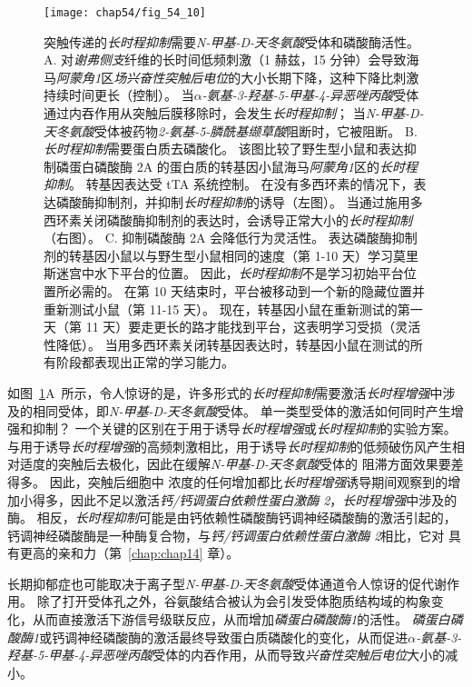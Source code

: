\begin{figure}[htbp]
	\centering
	\texttt{[image: chap54/fig\_54\_10]}
	\caption{突触传递的\textit{长时程抑制}需要\textit{N-甲基-D-天冬氨酸}受体和磷酸酶活性。
		A. 对\textit{谢弗侧支}纤维的长时间低频刺激（1 赫兹，15 分钟）会导致海马\textit{阿蒙角1}区\textit{场兴奋性突触后电位}的大小长期下降，这种下降比刺激持续时间更长（控制）。
		当\textit{$\alpha$-氨基-3-羟基-5-甲基-4-异恶唑丙酸}受体通过内吞作用从突触后膜移除时，会发生\textit{长时程抑制}；
		当\textit{N-甲基-D-天冬氨酸}受体被药物\textit{2-氨基-5-膦酰基缬草酸}阻断时，它被阻断\cite{dudek1992homosynaptic}。
		B. \textit{长时程抑制}需要蛋白质去磷酸化。
		该图比较了野生型小鼠和表达抑制磷蛋白磷酸酶 2A 的蛋白质的转基因小鼠海马\textit{阿蒙角1}区的\textit{长时程抑制}。
		转基因表达受 tTA 系统控制。
		在没有多西环素的情况下，表达磷酸酶抑制剂，并抑制\textit{长时程抑制}的诱导（左图）。
		当通过施用多西环素关闭磷酸酶抑制剂的表达时，会诱导正常大小的\textit{长时程抑制}（右图）。
		C. 抑制磷酸酶 2A 会降低行为灵活性。
		表达磷酸酶抑制剂的转基因小鼠以与野生型小鼠相同的速度（第 1-10 天）学习莫里斯迷宫中水下平台的位置。
		因此，\textit{长时程抑制}不是学习初始平台位置所必需的。
		在第 10 天结束时，平台被移动到一个新的隐藏位置并重新测试小鼠（第 11-15 天）。
		现在，转基因小鼠在重新测试的第一天（第 11 天）要走更长的路才能找到平台，这表明学习受损（灵活性降低）。
		当用多西环素关闭转基因表达时，转基因小鼠在测试的所有阶段都表现出正常的学习能力\cite{nicholls2008transgenic}。}
	\label{fig:54_10}
\end{figure}


如图~\ref{fig:54_10}A~所示，令人惊讶的是，许多形式的\textit{长时程抑制}需要激活\textit{长时程增强}中涉及的相同受体，即\textit{N-甲基-D-天冬氨酸}受体。
单一类型受体的激活如何同时产生增强和抑制？
一个关键的区别在于用于诱导\textit{长时程增强}或\textit{长时程抑制}的实验方案。
与用于诱导\textit{长时程增强}的高频刺激相比，用于诱导\textit{长时程抑制}的低频破伤风产生相对适度的突触后去极化，因此在缓解\textit{N-甲基-D-天冬氨酸}受体的  阻滞方面效果要差得多。
因此，突触后细胞中  浓度的任何增加都比\textit{长时程增强}诱导期间观察到的增加小得多，因此不足以激活\textit{钙/钙调蛋白依赖性蛋白激酶 2}，\textit{长时程增强}中涉及的酶。
相反，\textit{长时程抑制}可能是由钙依赖性磷酸酶钙调神经磷酸酶的激活引起的，钙调神经磷酸酶是一种酶复合物，与\textit{钙/钙调蛋白依赖性蛋白激酶 2}相比，它对  具有更高的亲和力（第~\ref{chap:chap14} 章）。


长期抑郁症也可能取决于离子型\textit{N-甲基-D-天冬氨酸}受体通道令人惊讶的促代谢作用。
除了打开受体孔之外，谷氨酸结合被认为会引发受体胞质结构域的构象变化，从而直接激活下游信号级联反应，从而增加\textit{磷蛋白磷酸酶1}的活性。
\textit{磷蛋白磷酸酶1}或钙调神经磷酸酶的激活最终导致蛋白质磷酸化的变化，从而促进\textit{$\alpha$-氨基-3-羟基-5-甲基-4-异恶唑丙酸}受体的内吞作用，从而导致\textit{兴奋性突触后电位}大小的减小。


